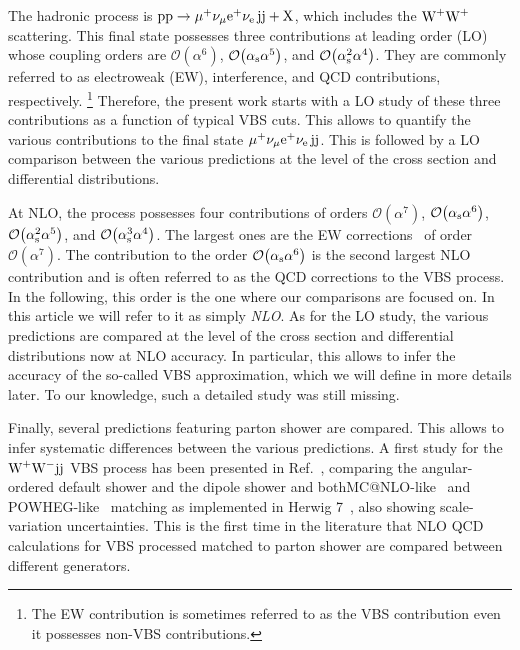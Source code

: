 The hadronic process is $\text{p}\text{p}\to\mu^+\nu_\mu{\rm e}^+\nu_{\rm e}\,\text{j}\text{j}+\mathrm{X}$, which includes the $\text{W}^+\text{W}^+$ scattering.
This final state possesses three contributions at leading order (LO) whose coupling orders are $\mathcal{O}{\left(\alpha^{6}\right)}$, $\mathcal{O}{\left(\alpha_{\rm s}\alpha^{5}\right)}$, and $\mathcal{O}{\left(\alpha_\text{s}^{2}\alpha^{4}\right)}$.
They are commonly referred to as electroweak (EW), interference, and QCD contributions, respectively.%
\footnote{The EW contribution is sometimes referred to as the VBS contribution even it possesses non-VBS contributions.}
Therefore, the present work starts with a LO study of these three contributions as a function of typical VBS cuts.
This allows to quantify the various contributions to the final state $\mu^+\nu_\mu{\rm e}^+\nu_{\rm e}\,\text{j}\text{j}$.
This is followed by a LO comparison between the various predictions at the level of the cross section and differential distributions.

At NLO, the process possesses four contributions of orders $\mathcal{O}{\left(\alpha^{7}\right)}$, $\mathcal{O}{\left(\alpha_\text{s}\alpha^{6}\right)}$, $\mathcal{O}{\left(\alpha_\text{s}^{2}\alpha^{5}\right)}$, and $\mathcal{O}{\left(\alpha_\text{s}^{3}\alpha^{4}\right)}$.
The largest ones are the EW corrections~\cite{Biedermann:2017bss,Biedermann:2016yds} of order $\mathcal{O}{\left(\alpha^{7}\right)}$.
The contribution to the order $\mathcal{O}{\left(\alpha_\text{s}\alpha^{6}\right)}$ is the second largest NLO contribution and is often referred to as the QCD corrections to the VBS process.
In the following, this order is the one where our comparisons are focused on.
In this article we will refer to it as simply \emph{NLO}.
As for the LO study, the various predictions are compared at the level of the cross section and differential distributions now at NLO accuracy.
In particular, this allows to infer the accuracy of the so-called VBS approximation, which we will define in more details later.
To our knowledge, such a detailed study was still missing.

Finally, several predictions featuring parton shower are compared.
This allows to infer systematic differences between the various predictions.
A first study for the $\text{W}^+ \text{W}^- \text{j} \text{j}$ VBS process has been presented in
Ref.~\cite{Rauch:2016upa}, comparing the angular-ordered default shower and the dipole
shower and both{\sc MC@NLO}-like~\cite{Frixione:2002ik} and {\sc POWHEG}-like~\cite{Nason:2004rx,Frixione:2007vw} matching as implemented
in {\sc Herwig 7}~\cite{Bellm:2015jjp}, also showing scale-variation uncertainties.
This is the first time in the literature that NLO QCD calculations for VBS processed matched to parton shower are compared between different generators.

